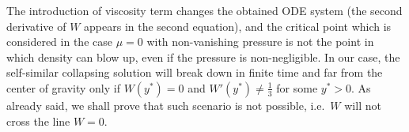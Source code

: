 \documentclass[reqno]{article}%
\theoremstyle{plain}
\theoremstyle{definition}
\theoremstyle{remark}
\numberwithin{equation}{section}
\begin{document}

\medskip

The introduction of viscosity term  changes the obtained ODE system (the second derivative of $W$ appears in the second equation), and the critical point which is considered in the case $\mu=0$ with non-vanishing pressure is not the point in which density can blow up, even if the pressure is non-negligible. In our case, the self-similar collapsing solution will break down in finite time and far from the center of gravity only if $W(y^\ast)=0$ and $W'(y^\ast)\neq \frac{1}{3}$ for some $y^\ast>0$. As already said, we shall prove that such scenario is not possible, i.e.\ $W$ will not cross the line $W=0.$


\medskip


   

\medskip
\end{document}
